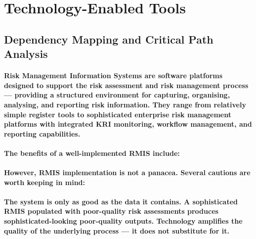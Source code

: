 \section{Technology-Enabled Tools}

\subsection{Dependency Mapping and Critical Path Analysis}
\paragraph{\textbf{Risk Management Information Systems} are software platforms designed to support the risk assessment and risk management process — providing a structured environment for capturing, organising, analysing, and reporting risk information. They range from relatively simple register tools to sophisticated enterprise risk management platforms with integrated KRI monitoring, workflow management, and reporting capabilities.}
\paragraph{The benefits of a well-implemented RMIS include:}
\begin{itemize}
\end{itemize}
\paragraph{However, RMIS implementation is not a panacea. Several cautions are worth keeping in mind:}
\paragraph{\textbf{The system is only as good as the data it contains}. A sophisticated RMIS populated with poor-quality risk assessments produces sophisticated-looking poor-quality outputs. Technology amplifies the quality of the underlying process — it does not substitute for it.}
